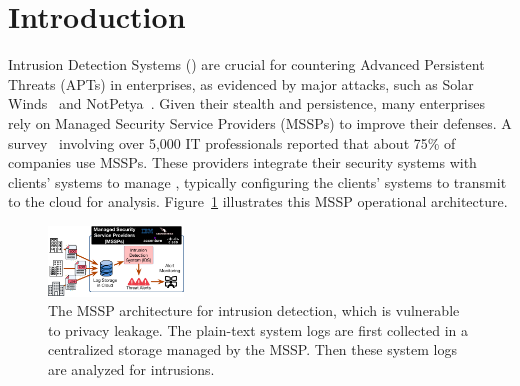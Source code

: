 \section{Introduction}
\label{s:intro}




Intrusion Detection Systems (\ids) are crucial for countering Advanced Persistent Threats (APTs) in enterprises, as evidenced by major attacks, such as Solar Winds~\cite{solarwinds} and NotPetya~\cite{notpetya}. Given their stealth and persistence, many enterprises rely on Managed Security Service Providers (MSSPs) to improve their defenses. A survey~\cite{msspsurvey} involving over 5,000 IT professionals reported that about 75\% of companies use MSSPs. These providers integrate their security systems with clients' systems to manage \logs, typically configuring the clients' systems to transmit \logs to the cloud for analysis. Figure~\ref{mssp} illustrates this MSSP operational architecture.


\begin{figure}[t!]
  \centering
  \includegraphics[width=0.32\textwidth]{fig/mssp.pdf}
  \caption{The MSSP architecture for intrusion detection, which is vulnerable to privacy leakage. The plain-text system logs are first collected in a centralized storage managed by the MSSP. Then these system logs are analyzed for intrusions.}
  \label{mssp}
  \vspace{-4ex}
\end{figure}

